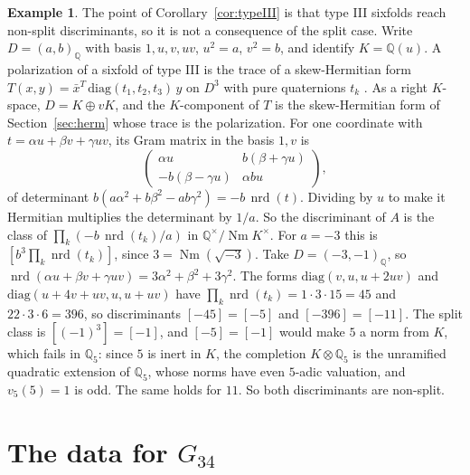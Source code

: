 \documentclass[11pt]{amsart}
\theoremstyle{definition}
\newtheorem{example}[theorem]{Example}
\theoremstyle{remark}
\newcommand{\Q}{\mathbb Q}
\newcommand{\Nm}{\operatorname{Nm}}
\begin{document}
\begin{example}
The point of Corollary~\ref{cor:typeIII} is that type III sixfolds reach non-split discriminants, so it is not a consequence of the split case. Write $D=(a,b)_\Q$ with basis $1,u,v,uv$, $u^2=a$, $v^2=b$, and identify $K=\Q(u)$. A polarization of a sixfold of type III is the trace of a skew-Hermitian form $T(x,y)=\bar x^{T}\,\mathrm{diag}(t_1,t_2,t_3)\,y$ on $D^3$ with pure quaternions $t_k$ \cite[\S2.5]{Abdulali}. As a right $K$-space, $D=K\oplus vK$, and the $K$-component of $T$ is the skew-Hermitian form of Section~\ref{sec:herm} whose trace is the polarization. For one coordinate with $t=\alpha u+\beta v+\gamma uv$, its Gram matrix in the basis $1,v$ is
\[
\begin{pmatrix}\alpha u& b(\beta+\gamma u)\\-b(\beta-\gamma u)&\alpha bu\end{pmatrix},
\]
of determinant $b(a\alpha^2+b\beta^2-ab\gamma^2)=-b\,\operatorname{nrd}(t)$. Dividing by $u$ to make it Hermitian multiplies the determinant by $1/a$. So the discriminant of $A$ is the class of $\prod_k(-b\,\operatorname{nrd}(t_k)/a)$ in $\Q^\times/\Nm K^\times$. For $a=-3$ this is $[b^3\prod_k\operatorname{nrd}(t_k)]$, since $3=\Nm(\sqrt{-3})$. Take $D=(-3,-1)_\Q$, so $\operatorname{nrd}(\alpha u+\beta v+\gamma uv)=3\alpha^2+\beta^2+3\gamma^2$. The forms $\mathrm{diag}(v,u,u+2uv)$ and $\mathrm{diag}(u+4v+uv,u,u+uv)$ have $\prod_k\operatorname{nrd}(t_k)=1\cdot3\cdot15=45$ and $22\cdot3\cdot6=396$, so discriminants $[-45]=[-5]$ and $[-396]=[-11]$. The split class is $[(-1)^3]=[-1]$, and $[-5]=[-1]$ would make $5$ a norm from $K$, which fails in $\Q_5$: since $5$ is inert in $K$, the completion $K\otimes\Q_5$ is the unramified quadratic extension of $\Q_5$, whose norms have even $5$-adic valuation, and $v_5(5)=1$ is odd. The same holds for $11$. So both discriminants are non-split.
\end{example}

\appendix
\section{The data for $G_{34}$}\label{app:data}
\end{document}
